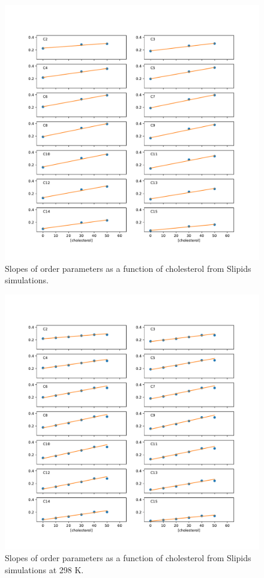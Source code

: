 \documentclass[journal=jpcbfk]{achemso}
\begin{document}
 \begin{figure}[]
  \centering
  \includegraphics[width=19cm]{../FIGS/slopesSLIPIDS.pdf}
  \caption{\label{slopesslipids}
    Slopes of order parameters as a function of cholesterol from Slipids simulations.
  }
\end{figure}
 \begin{figure}[]
  \centering
  \includegraphics[width=19cm]{../FIGS/slopesSLIPIDST310K.pdf}
  \caption{\label{slopesslipids310K}
    Slopes of order parameters as a function of cholesterol from Slipids simulations at 298 K.
  }
\end{figure}
\end{document}
